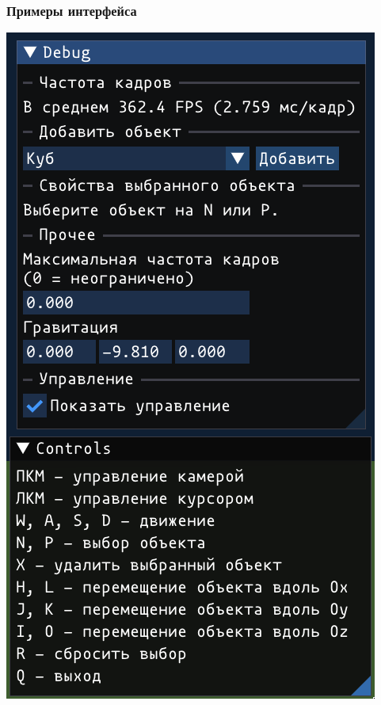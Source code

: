 \documentclass{beamer}
\begin{document}
\begin{frame}
\frametitle{Примеры интерфейса}
\centering
\includegraphics[height=0.9\textheight]{img/demo-icontrols}

\end{frame}
\end{document}
